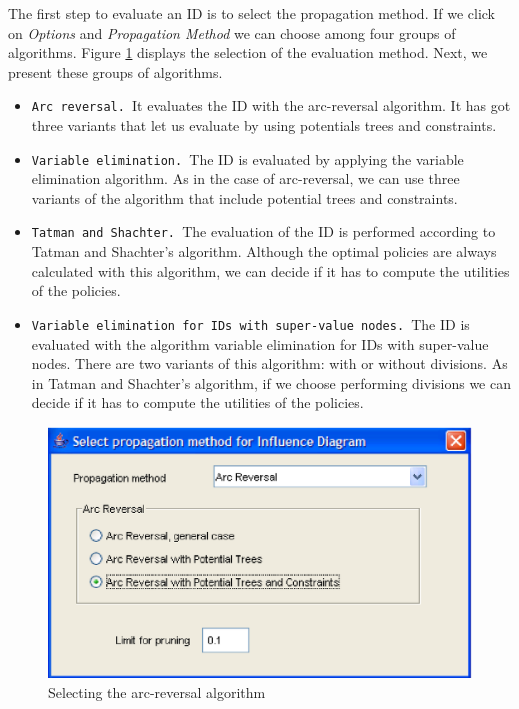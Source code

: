 The first step to evaluate an ID is to select the propagation method. If we
click on \textit{Options} and \textit{Propagation Method} we can choose
among four groups of algorithms. Figure \ref{fig:selectAR} displays the
selection of the evaluation method. Next, we present these groups of
algorithms.

\begin{itemize}
\item \texttt{Arc reversal. }It evaluates the ID with the arc-reversal
algorithm. It has got three variants that let us evaluate by using
potentials trees and constraints.

\item \texttt{Variable elimination. }The ID is evaluated by applying the
variable elimination algorithm. As in the case of arc-reversal, we can use
three variants of the algorithm that include potential trees and constraints.

\item \texttt{Tatman and Shachter. }The evaluation of the ID is performed
according to Tatman and Shachter's algorithm. Although the optimal policies
are always calculated with this algorithm, we can decide if it has to
compute the utilities of the policies.

\item \texttt{Variable elimination for IDs with super-value nodes. }The ID
is evaluated with the algorithm variable elimination for IDs with
super-value nodes. There are two variants of this algorithm: with or without
divisions. As in Tatman and Shachter's algorithm, if we choose performing
divisions we can decide if it has to compute the utilities of the policies.
\end{itemize}

\begin{figure}[h]
\begin{center}
\includegraphics[scale=0.4]{./ID/fig/selectAR.eps} \vspace{-0.5cm}
\end{center}
\caption{Selecting the arc-reversal algorithm}
\label{fig:selectAR}
\end{figure}

